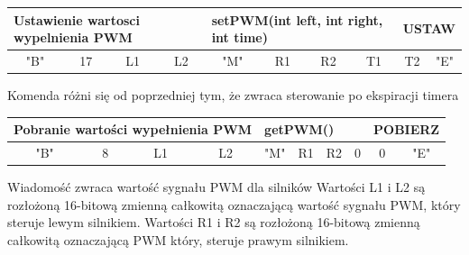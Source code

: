 \documentclass[eng,printmode]{mgr}
\begin{document}
\begin{table}[!htb]
\centering
\begin{adjustbox}{width=1\textwidth}
\label{my-label}
\begin{tabular}{|c|c|c|c|c|c|c|c|c|c|}
\hline
\multicolumn{4}{|l|}{Ustawienie wartosci wypelnienia PWM } & \multicolumn{4}{l|}{setPWM(int left, int right, int time)} & \multicolumn{2}{l|}{USTAW} \\ \hline
"B" \hspace{1em}             & 17\hspace{2em}              & L1\hspace{2em}              & L2\hspace{2em}         & "M"\hspace{2em}         & R1\hspace{2em}         & R2\hspace{2em}         & T1\hspace{2em}         & T2\hspace{2em}          & "E"\hspace{2em}          \\ \hline
\end{tabular}
\end{adjustbox}
\end{table}
Komenda różni się od poprzedniej tym, że zwraca sterowanie po ekspiracji timera


\begin{table}[!htb]
\centering
\begin{adjustbox}{width=1\textwidth}
\label{my-label}
\begin{tabular}{|c|c|c|c|c|c|c|c|c|c|}
\hline
\multicolumn{4}{|l|}{Pobranie wartości wypełnienia PWM  } & \multicolumn{4}{l|}{getPWM()} & \multicolumn{2}{l|}{POBIERZ} \\ \hline
"B" \hspace{1em}             & 8\hspace{2em}              & L1\hspace{2em}              & L2\hspace{2em}         & "M"\hspace{2em}         & R1\hspace{2em}         & R2\hspace{2em}         & 0\hspace{2em}         & 0\hspace{2em}          & "E"\hspace{2em}          \\ \hline
\end{tabular}
\end{adjustbox}
\end{table}
Wiadomość zwraca wartość sygnału PWM dla silników 
Wartości L1 i L2 są rozłożoną 16-bitową zmienną całkowitą oznaczającą wartość sygnału PWM, który steruje lewym silnikiem.
Wartości R1 i R2 są rozłożoną 16-bitową zmienną całkowitą oznaczającą PWM który, steruje prawym silnikiem.
\end{document}
